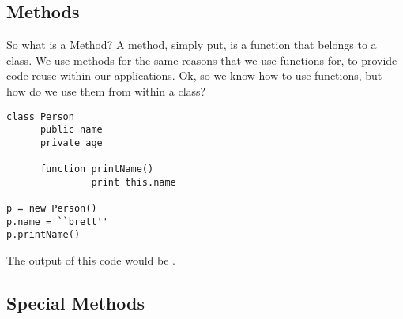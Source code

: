 \subsection{Methods}
So what is a Method?
A method, simply put, is a function that belongs to a class.
We use methods for the same reasons that we use functions for, to provide code reuse within our applications.
Ok, so we know how to use functions, but how do we use them from within a class?
\par

\begin{lstlisting}[caption={Class Methods}]
class Person
      public name
      private age
      
      function printName()
               print this.name

p = new Person()
p.name = ``brett''
p.printName()      
\end{lstlisting}

The output of this code would be .

\subsection{Special Methods}

